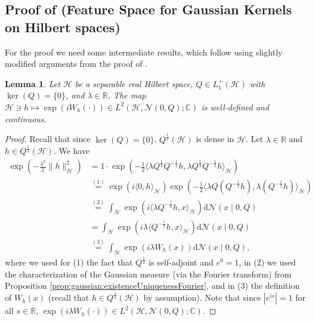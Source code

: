 \documentclass[letterpaper]{article} %
\newcommand{\R}{\mathbb{R}}
\newcommand{\hs}[1]{\mathcal{#1}} %
\newcommand{\Normal}{\mathcal{N}}
\newcommand{\C}{\mathbb{C}}
\newcommand{\stp}[2]{{\overset{(#2)}{#1}}}
\newcommand{\stpx}[1]{{(#1)}}
\newtheorem{lemma}[theorem]{Lemma}
\begin{document}
\subsection{Proof of  (Feature Space for Gaussian Kernels on Hilbert spaces)} \label{sec:distrslt:proofOffeatureSpaceGaussianKernelOnHS}
For the proof we need some intermediate results, which follow using slightly modified arguments from the proof of  \cite[Proposition 1.2.7]{daprato2002second}.
\begin{lemma}
Let $\hs{H}$ be a separable real Hilbert space, $Q\in L_1^+(\hs{H})$ with $\ker(Q)=\{0\}$, and $\lambda\in\R$.
The map $\hs{H}\ni h \mapsto \exp(i W_h(\cdot)) \in L^2(\hs{H},\Normal(0,Q);\C)$ is well-defined and continuous.
\end{lemma}
\begin{proof}
Recall that since $\ker(Q)=\{0\}$, $Q^\frac12(\hs{H})$ is dense in $\hs{H}$.
Let $\lambda\in\R$ and $h\in Q^{\frac12}(\hs{H})$. We have
\begin{align*}
    \exp\left(-\frac{\lambda^2}{2}\|h\|_\hs{H}^2\right)
    & = 1 \cdot \exp\left(-\frac{1}{2}\langle \lambda Q^{\frac12}Q^{-\frac12}h, \lambda Q^{\frac12}Q^{-\frac12}h \rangle_\hs{H}\right)  \\
    & \stp{=}{1} \exp(i \langle 0, h\rangle_\hs{H}) 
        \exp\left(-\frac{1}{2}\langle \lambda Q \left(Q^{-\frac12}h\right), \lambda \left(Q^{-\frac12}h\right) \rangle_\hs{H}\right) \\
    & \stp{=}{2} \int_\hs{H} \exp(i\langle  \lambda Q^{-\frac12}h, x \rangle_\hs{H})\mathrm{d}\Normal(x\mid 0, Q) \\
    & = \int_\hs{H} \exp(i\lambda \langle Q^{-\frac12}h, x \rangle_\hs{H})\mathrm{d}\Normal(x\mid 0, Q) \\
    & \stp{=}{3} \int_\hs{H} \exp(i\lambda W_h(x))\mathrm{d}\Normal(x\mid 0, Q),
\end{align*}
where we used for \stpx{1} the fact that $Q^{\frac12}$ is self-adjoint and $e^0=1$,
in \stpx{2} we used the characterization of the Gaussian measure (via the Fourier transform) from Proposition \ref{prop:gaussian:existenceUniquenessFourier},
and in \stpx{3} the definition of $W_h(x)$ (recall that $h\in Q^{\frac12}(\hs{H})$ by assumption).
Note that since $|e^{is}|=1$ for all $s\in\R$, $\exp(i \lambda W_h(\cdot))\in L^2(\hs{H},\Normal(0,Q);\C)$.


\end{proof}
\end{document}
